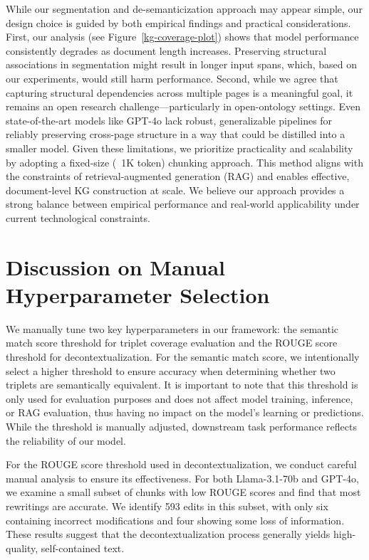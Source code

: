 \documentclass{article} %
\begin{document}
While our segmentation and de-semanticization approach may appear simple, our design choice is guided by both empirical findings and practical considerations. First, our analysis (see Figure~\ref{kg-coverage-plot}) shows that model performance consistently degrades as document length increases. Preserving structural associations in segmentation might result in longer input spans, which, based on our experiments, would still harm performance. Second, while we agree that capturing structural dependencies across multiple pages is a meaningful goal, it remains an open research challenge—particularly in open-ontology settings. Even state-of-the-art models like GPT-4o lack robust, generalizable pipelines for reliably preserving cross-page structure in a way that could be distilled into a smaller model. Given these limitations, we prioritize practicality and scalability by adopting a fixed-size (~1K token) chunking approach. This method aligns with the constraints of retrieval-augmented generation (RAG) and enables effective, document-level KG construction at scale. We believe our approach provides a strong balance between empirical performance and real-world applicability under current technological constraints.

\section{Discussion on Manual Hyperparameter Selection}
We manually tune two key hyperparameters in our framework: the semantic match score threshold for triplet coverage evaluation and the ROUGE score threshold for decontextualization. For the semantic match score, we intentionally select a higher threshold to ensure accuracy when determining whether two triplets are semantically equivalent. It is important to note that this threshold is only used for evaluation purposes and does not affect model training, inference, or RAG evaluation, thus having no impact on the model's learning or predictions. While the threshold is manually adjusted, downstream task performance reflects the reliability of our model.

For the ROUGE score threshold used in decontextualization, we conduct careful manual analysis to ensure its effectiveness. For both Llama-3.1-70b and GPT-4o, we examine a small subset of chunks with low ROUGE scores and find that most rewritings are accurate. We identify 593 edits in this subset, with only six containing incorrect modifications and four showing some loss of information. These results suggest that the decontextualization process generally yields high-quality, self-contained text.
\end{document}
